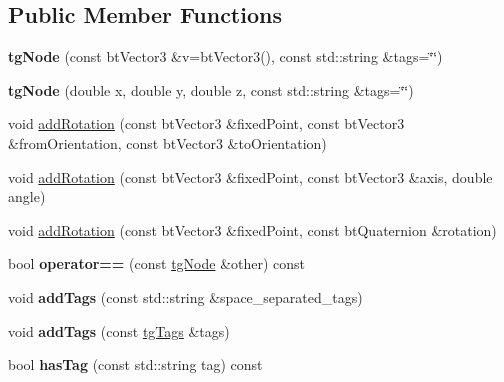 \subsection*{Public Member Functions}
\begin{DoxyCompactItemize}
\item 
\hypertarget{classtg_node_ad9f3791def4c4fbcdd0de0a56703a392}{{\bfseries tg\-Node} (const bt\-Vector3 \&v=bt\-Vector3(), const std\-::string \&tags=\char`\"{}\char`\"{})}\label{classtg_node_ad9f3791def4c4fbcdd0de0a56703a392}

\item 
\hypertarget{classtg_node_af276a20197eace49bd3109a61e8088ab}{{\bfseries tg\-Node} (double x, double y, double z, const std\-::string \&tags=\char`\"{}\char`\"{})}\label{classtg_node_af276a20197eace49bd3109a61e8088ab}

\item 
void \hyperlink{classtg_node_a71cfd5ccea74471b820035994e87daef}{add\-Rotation} (const bt\-Vector3 \&fixed\-Point, const bt\-Vector3 \&from\-Orientation, const bt\-Vector3 \&to\-Orientation)
\item 
void \hyperlink{classtg_node_a36e8382299eb280ce21179d4c6733e63}{add\-Rotation} (const bt\-Vector3 \&fixed\-Point, const bt\-Vector3 \&axis, double angle)
\item 
void \hyperlink{classtg_node_a81ecb640ebfbd43461cc434696d6cdbb}{add\-Rotation} (const bt\-Vector3 \&fixed\-Point, const bt\-Quaternion \&rotation)
\item 
\hypertarget{classtg_node_a91c29f1b46c8c3ef45bf3b505b450da6}{bool {\bfseries operator==} (const \hyperlink{classtg_node}{tg\-Node} \&other) const }\label{classtg_node_a91c29f1b46c8c3ef45bf3b505b450da6}

\item 
\hypertarget{classtg_taggable_af0b8f1729653b0b90d2fecbd51163612}{void {\bfseries add\-Tags} (const std\-::string \&space\-\_\-separated\-\_\-tags)}\label{classtg_taggable_af0b8f1729653b0b90d2fecbd51163612}

\item 
\hypertarget{classtg_taggable_af28e3fe1a7e4eb28772dc006d575dd1f}{void {\bfseries add\-Tags} (const \hyperlink{classtg_tags}{tg\-Tags} \&tags)}\label{classtg_taggable_af28e3fe1a7e4eb28772dc006d575dd1f}

\item 
\hypertarget{classtg_taggable_ae31f65869c8887bfeb34a344902c4d5b}{bool {\bfseries has\-Tag} (const std\-::string tag) const }\label{classtg_taggable_ae31f65869c8887bfeb34a344902c4d5b}


\end{DoxyCompactItemize}
